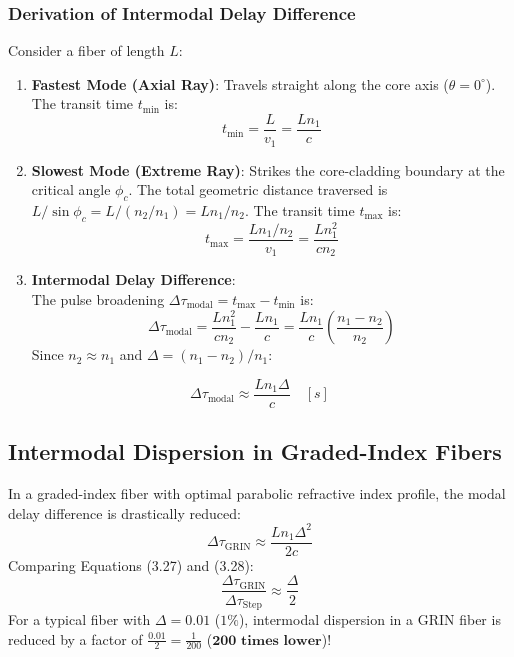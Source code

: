 \subsubsection{Derivation of Intermodal Delay Difference}
Consider a fiber of length $L$:
\begin{enumerate}
    \item \textbf{Fastest Mode (Axial Ray)}: Travels straight along the core axis ($\theta = 0^\circ$). The transit time $t_{\text{min}}$ is:
    \begin{equation}
        t_{\text{min}} = \frac{L}{v_1} = \frac{L n_1}{c}
    \end{equation}
    \item \textbf{Slowest Mode (Extreme Ray)}: Strikes the core-cladding boundary at the critical angle $\phi_c$. The total geometric distance traversed is $L / \sin\phi_c = L / (n_2/n_1) = L n_1 / n_2$. The transit time $t_{\text{max}}$ is:
    \begin{equation}
        t_{\text{max}} = \frac{L n_1 / n_2}{v_1} = \frac{L n_1^2}{c n_2}
    \end{equation}
    \item \textbf{Intermodal Delay Difference}:\\
    The pulse broadening $\Delta \tau_{\text{modal}} = t_{\text{max}} - t_{\text{min}}$ is:
    \begin{equation}
        \Delta \tau_{\text{modal}} = \frac{L n_1^2}{c n_2} - \frac{L n_1}{c} = \frac{L n_1}{c}\left( \frac{n_1 - n_2}{n_2} \right)
    \end{equation}
    Since $n_2 \approx n_1$ and $\Delta = (n_1 - n_2)/n_1$:
\end{enumerate}

\begin{keyequation}
\begin{equation}
    \Delta \tau_{\text{modal}} \approx \frac{L n_1 \Delta}{c} \quad [\si{s}]
\end{equation}
\end{keyequation}

\subsection{Intermodal Dispersion in Graded-Index Fibers}
In a graded-index fiber with optimal parabolic refractive index profile, the modal delay difference is drastically reduced:
\begin{equation}
    \Delta \tau_{\text{GRIN}} \approx \frac{L n_1 \Delta^2}{2 c}
\end{equation}
Comparing Equations (3.27) and (3.28):
\begin{equation}
    \frac{\Delta \tau_{\text{GRIN}}}{\Delta \tau_{\text{Step}}} \approx \frac{\Delta}{2}
\end{equation}
For a typical fiber with $\Delta = 0.01$ ($1\%$), intermodal dispersion in a GRIN fiber is reduced by a factor of $\frac{0.01}{2} = \frac{1}{200}$ ($\mathbf{200\text{ times lower}}$)!

